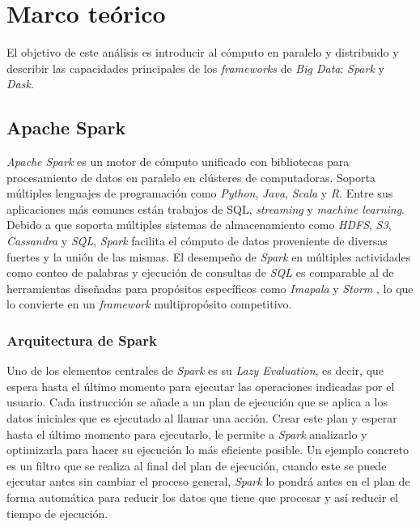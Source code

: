\chapter{Marco teórico}

\noindent El objetivo de este análisis es introducir al cómputo en paralelo y distribuido y describir las capacidades principales de los \textit{frameworks}  de \textit{Big Data}: \textit{Spark} y \textit{Dask}.

\newpage


\section{Apache Spark}

\textit{Apache Spark} es un motor de cómputo unificado con bibliotecas para procesamiento de datos en paralelo en clústeres de computadoras. Soporta múltiples lenguajes de programación como \textit{Python}, \textit{Java}, \textit{Scala} y \textit{R}. Entre sus aplicaciones más comunes están trabajos de SQL, \textit{streaming} y \textit{machine learning}\cite{sparkguide}. Debido a que soporta múltiples sistemas de almacenamiento como \textit{HDFS}, \textit{S3}, \textit{Cassandra} y \textit{SQL}, \textit{Spark} facilita el cómputo de datos proveniente de diversas fuertes y la unión de las mismas. El desempeño de \textit{Spark} en múltiples actividades como conteo de palabras y ejecución de consultas de \textit{SQL} es comparable al de herramientas diseñadas para propósitos específicos como \textit{Imapala} y \textit{Storm} \cite{sparkberkeley}, lo que lo convierte en un \textit{framework} multipropósito competitivo.

\subsection{Arquitectura de Spark}

Uno de los elementos centrales de \textit{Spark} es su \textit{Lazy Evaluation}, es decir, que espera hasta el último momento para ejecutar las operaciones indicadas por el usuario. Cada instrucción se añade a un plan de ejecución que se aplica a los datos iniciales que es ejecutado al llamar una acción. Crear este plan y esperar hasta el último momento para ejecutarlo, le permite a \textit{Spark} analizarlo y optimizarla para hacer su ejecución lo más eficiente posible. Un ejemplo concreto es un filtro que se realiza al final del plan de ejecución, cuando este se puede ejecutar antes sin cambiar el proceso general, \textit{Spark} lo pondrá antes en el plan de forma automática para reducir los datos que tiene que procesar y así reducir el tiempo de ejecución.

